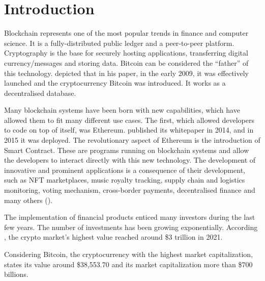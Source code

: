 \chapter{Introduction}
\label{ch:Introduction}
Blockchain represents one of the most popular trends in finance and computer science.
It is a fully-distributed public ledger and a peer-to-peer platform.
Cryptography is the base for securely hosting applications, transferring digital currency/messages and
storing data. Bitcoin can be considered the “father” of this technology. \citet{Bitcoin} depicted that in his paper, in the early 2009,
it was effectively launched and the cryptocurrency Bitcoin was introduced. 
It works as a decentralised database.

Many blockchain systems have been born with new capabilities, 
which have allowed them to fit many different use cases. The first, which allowed developers to 
code on top of itself, was Ethereum.
\citet{Ethereum} published its whitepaper in 2014, and in 2015 it was deployed.
The revolutionary aspect of Ethereum is the introduction of Smart Contract.
These are programs running on blockchain systems and allow the developers to interact directly 
with this new technology. 
The development of innovative and prominent applications is a consequence of their development, such as NFT marketplaces, music royalty tracking, supply chain and logistics monitoring, voting mechanism, 
cross-border payments, decentralised finance and many others (\cite{BcUseCases}).  

The implementation of financial products enticed many investors during the last few years. 
The number of investments has been growing exponentially. 
According \citet{statista}, the crypto market's highest value reached around \$3 trillion in 2021.

Considering Bitcoin, the cryptocurrency with the highest market capitalization, 
\citet{CoinGeko} states its value around \$38,553.70 and its market capitalization more than \$700 billions.

